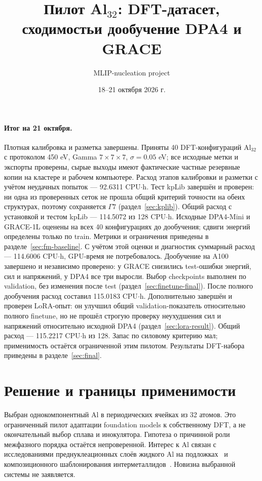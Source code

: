 \documentclass[11pt,a4paper]{article}
\title{Пилот Al$_{32}$: DFT-датасет, сходимость\newline и дообучение DPA4 и GRACE}
\author{MLIP-nucleation project}
\date{18--21 октября 2026 г.}
\begin{document}
\maketitle

\paragraph{Итог на 21 октября.} Плотная калибровка и разметка завершены.
Приняты 40 DFT-конфигураций Al$_{32}$ с протоколом 450 eV,
Gamma $7\times7\times7$, $\sigma=0.05$ eV; все исходные метки и экспорты
проверены, сырые выходы имеют фактические частные резервные копии на кластере
и рабочем компьютере. Расход этапов калибровки и разметки с учётом
неудачных попыток --- 92.6311 CPU$\cdot$h. Тест kpLib завершён и проверен:
ни одна из проверенных сеток не прошла общий критерий точности на обеих
структурах, поэтому сохраняется $\Gamma7$ (раздел~\ref{sec:kplib}).
Общий расход с установкой и тестом kpLib --- 114.5072 из 128 CPU$\cdot$h.
Исходные DPA4-Mini и GRACE-1L оценены на всех 40 конфигурациях
до дообучения; сдвиги энергий определены только по train.
Метрики и ограничения приведены в разделе~\ref{sec:fm-baseline}.
С учётом этой оценки и диагностик суммарный расход ---
114.6006 CPU$\cdot$h, GPU-время не потребовалось.
Дообучение на A100 завершено и независимо проверено:
у GRACE снизились test-ошибки энергий, сил и напряжений,
у DPA4 все три выросли. Выбор checkpoints выполнен по validation,
без изменения после test (раздел~\ref{sec:finetune-final}).
После полного дообучения расход составил 115.0183 CPU$\cdot$h.
Дополнительно завершён и проверен LoRA-опыт: он улучшил общий
validation-показатель относительно полного finetune, но не прошёл
строгую проверку неухудшения сил и напряжений относительно исходной DPA4
(раздел~\ref{sec:lora-result}). Общий расход --- 115.2217 CPU$\cdot$h из 128.
Запас по силовому критерию мал; применимость остаётся ограниченной
этим пилотом. Результаты DFT-набора приведены в разделе~\ref{sec:final}.

\section{Решение и границы применимости}
Выбран однокомпонентный Al в периодических ячейках из 32 атомов.
Это ограниченный пилот адаптации foundation models к собственному DFT,
а не окончательный выбор сплава и инокулятора. Гипотеза о причинной роли
межфазного порядка остаётся непроверенной. Интерес к Al связан с исследованиями
преднуклеационных слоёв жидкого Al на подложках~\cite{layering} и
композиционного шаблонирования интерметаллидов~\cite{templating}.
Новизна выбранной системы не заявляется.
\end{document}
